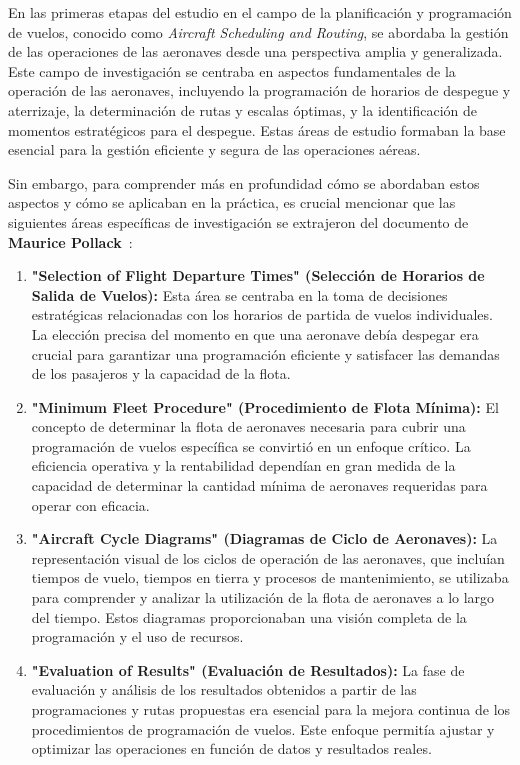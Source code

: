 \documentclass[letter, 10pt]{article}
\begin{document}
En las primeras etapas del estudio en el campo de la planificaci\'on y programaci\'on de vuelos, conocido como \textit{Aircraft Scheduling and Routing}, se abordaba la gesti\'on de las operaciones de las aeronaves desde una perspectiva amplia y generalizada. Este campo de investigaci\'on se centraba en aspectos fundamentales de la operaci\'on de las aeronaves, incluyendo la programaci\'on de horarios de despegue y aterrizaje, la determinaci\'on de rutas y escalas \'optimas, y la identificaci\'on de momentos estrat\'egicos para el despegue. Estas \'areas de estudio formaban la base esencial para la gesti\'on eficiente y segura de las operaciones a\'ereas.

Sin embargo, para comprender m\'as en profundidad c\'omo se abordaban estos aspectos y c\'omo se aplicaban en la pr\'actica, es crucial mencionar que las siguientes \'areas espec\'ificas de investigaci\'on se extrajeron del documento de \textbf{Maurice Pollack}~\cite{pollack1974}:

\begin{enumerate}
    \item \textbf{"Selection of Flight Departure Times" (Selecci\'on de Horarios de Salida de Vuelos):} Esta \'area se centraba en la toma de decisiones estrat\'egicas relacionadas con los horarios de partida de vuelos individuales. La elecci\'on precisa del momento en que una aeronave deb\'ia despegar era crucial para garantizar una programaci\'on eficiente y satisfacer las demandas de los pasajeros y la capacidad de la flota.

    \item \textbf{"Minimum Fleet Procedure" (Procedimiento de Flota M\'inima):} El concepto de determinar la flota de aeronaves necesaria para cubrir una programaci\'on de vuelos espec\'ifica se convirti\'o en un enfoque cr\'itico. La eficiencia operativa y la rentabilidad depend\'ian en gran medida de la capacidad de determinar la cantidad m\'inima de aeronaves requeridas para operar con eficacia.

    \item \textbf{"Aircraft Cycle Diagrams" (Diagramas de Ciclo de Aeronaves):} La representaci\'on visual de los ciclos de operaci\'on de las aeronaves, que inclu\'ian tiempos de vuelo, tiempos en tierra y procesos de mantenimiento, se utilizaba para comprender y analizar la utilizaci\'on de la flota de aeronaves a lo largo del tiempo. Estos diagramas proporcionaban una visi\'on completa de la programaci\'on y el uso de recursos.

    \item \textbf{"Evaluation of Results" (Evaluaci\'on de Resultados):} La fase de evaluaci\'on y an\'alisis de los resultados obtenidos a partir de las programaciones y rutas propuestas era esencial para la mejora continua de los procedimientos de programaci\'on de vuelos. Este enfoque permit\'ia ajustar y optimizar las operaciones en funci\'on de datos y resultados reales.
\end{enumerate}
\end{document}
